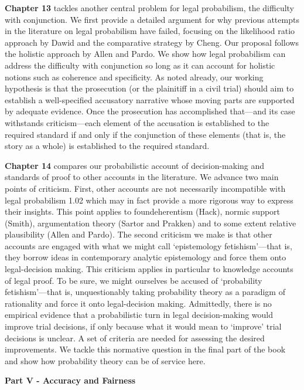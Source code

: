 \documentclass[
  10pt,
  dvipsnames,enabledeprecatedfontcommands]{scrartcl}
\begin{document}
\textbf{Chapter 13} tackles another central problem for legal
probabilism, the difficulty with conjunction. We first provide a
detailed argument for why previous attempts in the literature on legal
probabilism have failed, focusing on the likelihood ratio approach by
Dawid and the comparative strategy by Cheng. Our proposal follows the
holistic approach by Allen and Pardo. We show how legal probabilism can
address the difficulty with conjunction so long as it can account for
holistic notions such as coherence and specificity. As noted already,
our working hypothesis is that the prosecution (or the plainitiff in a
civil trial) should aim to establish a well-specified accusatory
narrative whose moving parts are supported by adequate evidence. Once
the prosecution has accomplished that---and its case withstands
criticism---each element of the accusation is established to the
required standard if and only if the conjunction of these elements (that
is, the story as a whole) is established to the required standard.

\textbf{Chapter 14} compares our probabilistic account of
decision-making and standards of proof to other accounts in the
literature. We advance two main points of criticism. First, other
accounts are not necessarily incompatible with legal probabilism 1.02
which may in fact provide a more rigorous way to express their insights.
This point applies to foundeherentism (Hack), normic support (Smith),
argumentation theory (Sartor and Prakken) and to some extent relative
plausibility (Allen and Pardo). The second criticism we make is that
other accounts are engaged with what we might call `epistemology
fetishism'---that is, they borrow ideas in contemporary analytic
epistemology and force them onto legal-decision making. This criticism
applies in particular to knowledge accounts of legal proof. To be sure,
we might ourselves be accused of `probability fetishism'---that is,
unquestionably taking probability theory as a paradigm of rationality
and force it onto legal-decision making. Admittedly, there is no
empirical evidence that a probabilistic turn in legal decision-making
would improve trial decisions, if only because what it would mean to
`improve' trial decisions is unclear. A set of criteria are needed for
assessing the desired improvements. We tackle this normative question in
the final part of the book and show how probability theory can be of
service here.

\vspace{3mm}

\noindent \textbf{Part V - Accuracy and Fairness}
\end{document}
